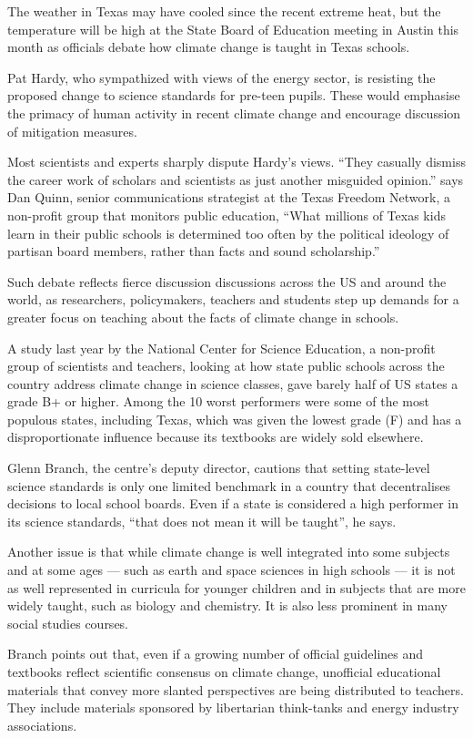 The weather in Texas may have cooled since the recent extreme heat, but the temperature will be high at the State Board of Education meeting in Austin this month as officials debate how climate change is taught in Texas schools.


Pat Hardy, who sympathized with views of the energy sector, is resisting the proposed change to science standards for pre-teen pupils. These would emphasise the primacy of human activity in recent climate change and encourage discussion of mitigation measures.


Most scientists and experts sharply dispute Hardy's views. ``They casually dismiss the career work of scholars and scientists as just another misguided opinion.'' says Dan Quinn, senior communications strategist at the Texas Freedom Network, a non-profit group that monitors public education, ``What millions of Texas kids learn in their public schools is determined too often by the political ideology of partisan board members, rather than facts and sound scholarship.''


Such debate reflects fierce discussion discussions across the US and around the world, as researchers, policymakers, teachers and students step up demands for a greater focus on teaching about the facts of climate change in schools.


A study last year by the National Center for Science Education, a non-profit group of scientists and teachers, looking at how state public schools across the country address climate change in science classes, gave barely half of US states a grade B+ or higher. Among the 10 worst performers were some of the most populous states, including Texas, which was given the lowest grade (F) and has a disproportionate influence because its textbooks are widely sold elsewhere.


Glenn Branch, the centre's deputy director, cautions that setting state-level science standards is only one limited benchmark in a country that decentralises decisions to local school boards. Even if a state is considered a high performer in its science standards, ``that does not mean it will be taught'', he says.


Another issue is that while climate change is well integrated into some subjects and at some ages — such as earth and space sciences in high schools — it is not as well represented in curricula for younger children and in subjects that are more widely taught, such as biology and chemistry. It is also less prominent in many social studies courses.


Branch points out that, even if a growing number of official guidelines and textbooks reflect scientific consensus on climate change, unofficial educational materials that convey more slanted perspectives are being distributed to teachers. They include materials sponsored by libertarian think-tanks and energy industry associations.